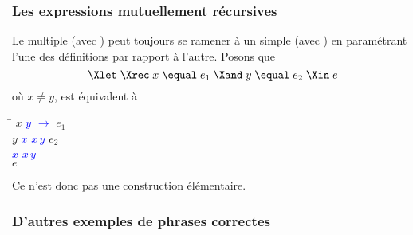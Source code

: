 % 
%
\begin{frame}
\frametitle{Les expressions mutuellement récursives}
\label{expressions_mutuellement_recursives}

Le \Xlet{} \Xrec{} multiple (avec \Xand) peut toujours se ramener à un
\Xlet{} \Xrec{} simple (avec \Xin) en paramétrant l'une des
définitions par rapport à l'autre. Posons que
\begin{equation*}
\Xlet \; \Xrec \; x \; \equal \; e_1 \; \Xand \; y \; \equal \; e_2 \;
\Xin \; e
\end{equation*}
où $x \neq y$, est équivalent à
\begin{center}
\begin{minipage}{0.3\linewidth}
\begin{tabbing}
\Xlet{} \= \Xrec{} $x$ \equal{} \textcolor{blue}{\Xfun{} $y$
  $\rightarrow$} $e_1$ \Xin\\
\> \Xlet{} \Xrec{} $y$ \equal{} \textcolor{blue}{\Xlet{} $x$ \equal{} $x \, y$ \Xin} $e_2$ \Xin\\
\> \textcolor{blue}{\Xlet{} $x$ \equal{} $x \, y$}\\
\textcolor{blue}{\Xin} $e$
\end{tabbing}
\end{minipage}
\end{center}
Ce n'est donc pas une construction élémentaire.

\end{frame}

%
\begin{frame}
\frametitle{D'autres exemples de phrases correctes}






\end{frame}

